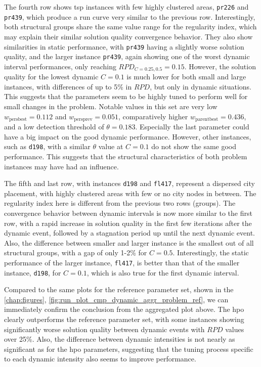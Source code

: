 The fourth row shows \gls{tsp} instances with few highly clustered areas, \texttt{pr226} and \texttt{pr439}, which produce a run curve very similar to the previous row. Interestingly, both structural groups share the same value range for the regularity index, which may explain their similar solution quality convergence behavior. They also show similarities in static performance, with \texttt{pr439} having a slightly worse solution quality, and the larger instance \texttt{pr439}, again showing one of the worst dynamic interval performances, only reaching $RPD_{C=0.25,0.5}=0.15$. However, the solution quality for the lowest dynamic $C=0.1$ is much lower for both small and large instances, with differences of up to 5\% in $RPD$, but only in dynamic situations. This suggests that the parameters seem to be highly tuned to perform well for small changes in the problem. Notable values in this set are very low $w_\text{persbest} = 0.112$ and $w_\text{persprev} = 0.051$, comparatively higher  $w_\text{parentbest} = 0.436$, and a low detection threshold of $\theta = 0.183$. Especially the last parameter could have a big impact on the good dynamic performance. However, other instances, such as \texttt{d198}, with a similar $\theta$ value at $C=0.1$ do not show the same good performance. This suggests that the structural characteristics of both problem instances may have had an influence.

The fifth and last row, with instances \texttt{d198} and \texttt{fl417}, represent a dispersed city placement, with highly clustered areas with few or no city nodes in between. The regularity index here is different from the previous two rows (groups). The convergence behavior between dynamic intervals is now more similar to the first row, with a rapid increase in solution quality in the first few iterations after the dynamic event, followed by a stagnation period up until the next dynamic event. Also, the difference between smaller and larger instance is the smallest out of all structural groups, with a gap of only 1-2\% for $C=0.5$. Interestingly, the static performance of the larger instance, \texttt{fl417}, is better than that of the smaller instance, \texttt{d198}, for $C=0.1$, which is also true for the first dynamic interval.

Compared to the same plots for the reference parameter set, shown in the \cref{chap:figures}, \cref{fig:run_plot_cmp_dynamic_aggr_problem_ref}, we can immediately confirm the conclusion from the aggregated plot above. The \gls{hpo} clearly outperforms the reference parameter set, with some instances showing significantly worse solution quality between dynamic events with $RPD$ values over 25\%. Also, the difference between dynamic intensities is not nearly as significant as for the \gls{hpo} parameters, suggesting that the tuning process specific to each dynamic intensity also seems to improve performance.

